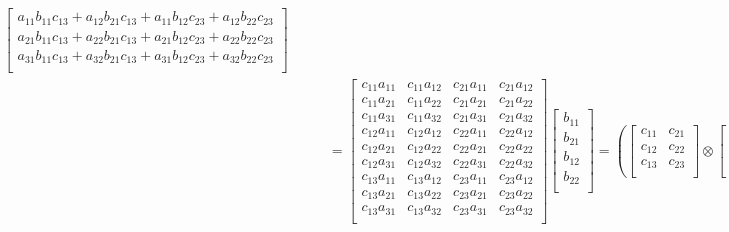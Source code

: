 \documentclass[12pt,a4paper]{article}
\begin{document}
\begin{itemize}
\begin{itemize}
\begin{align}
\begin{bmatrix}
        a_{11}b_{11}c_{13} + a_{12}b_{21}c_{13} + a_{11}b_{12}c_{23} + a_{12}b_{22}c_{23} \\
        a_{21}b_{11}c_{13} + a_{22}b_{21}c_{13} + a_{21}b_{12}c_{23} + a_{22}b_{22}c_{23} \\
        a_{31}b_{11}c_{13} + a_{32}b_{21}c_{13} + a_{31}b_{12}c_{23} + a_{32}b_{22}c_{23} \\
     \end{bmatrix} \nonumber \\
      & \qquad
        =   
     \begin{bmatrix}
       c_{11}a_{11} & c_{11}a_{12} & c_{21}a_{11} & c_{21}a_{12} \\
       c_{11}a_{21} & c_{11}a_{22} & c_{21}a_{21} & c_{21}a_{22} \\
       c_{11}a_{31} & c_{11}a_{32} & c_{21}a_{31} & c_{21}a_{32} \\
       c_{12}a_{11} & c_{12}a_{12} & c_{22}a_{11} & c_{22}a_{12} \\
       c_{12}a_{21} & c_{12}a_{22} & c_{22}a_{21} & c_{22}a_{22} \\
       c_{12}a_{31} & c_{12}a_{32} & c_{22}a_{31} & c_{22}a_{32} \\
       c_{13}a_{11} & c_{13}a_{12} & c_{23}a_{11} & c_{23}a_{12} \\
       c_{13}a_{21} & c_{13}a_{22} & c_{23}a_{21} & c_{23}a_{22} \\
       c_{13}a_{31} & c_{13}a_{32} & c_{23}a_{31} & c_{23}a_{32} \\
     \end{bmatrix} 
     \begin{bmatrix}
       b_{11} \\
       b_{21} \\
       b_{12} \\
       b_{22} \\
     \end{bmatrix}
       =
       \left(
     \begin{bmatrix}
       c_{11} & c_{21} \\
       c_{12} & c_{22} \\
       c_{13} & c_{23} \\
     \end{bmatrix}
     \otimes
     \begin{bmatrix}
       a_{11} & a_{12} \\
       a_{21} & a_{22} \\
       a_{31} & a_{32} \\
     \end{bmatrix}
       \right)       
     \begin{bmatrix}
       b_{11} \\
       b_{21} \\
       b_{12} \\
       b_{22} \\
     \end{bmatrix}
    \nonumber%
    \end{align}
  \end{itemize}

\end{itemize}
\end{document}
